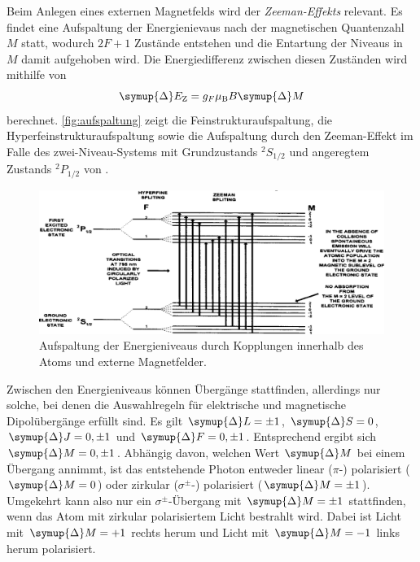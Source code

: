     Beim Anlegen eines externen Magnetfelds wird der \textit{Zeeman-Effekts} relevant.
    Es findet eine Aufspaltung der Energienievaus nach der magnetischen Quantenzahl $M$ statt,
    wodurch $2F+1$ Zustände entstehen und die Entartung der Niveaus in $M$ damit aufgehoben wird.
    Die Energiedifferenz zwischen diesen Zuständen wird mithilfe von
    \begin{equation}
        \symup{\Delta} E_\text{Z} = g_F \mu_\text{B} B \symup{\Delta} M
        \label{eqn:zeemanaufspaltung}
    \end{equation}
    berechnet.
    \autoref{fig:aufspaltung} zeigt die Feinstrukturaufspaltung,
    die Hyperfeinstrukturaufspaltung sowie die Aufspaltung durch den Zeeman-Effekt im Falle des zwei-Niveau-Systems mit Grundzustands $^2S_{1/2}$ und angeregtem Zustands $^2P_{1/2}$ von .
    \begin{figure}[H]
        \centering
        \includegraphics[width=\textwidth]{content/img/Lit2_Abb_2D-3.png}
        \caption{Aufspaltung der Energieniveaus durch Kopplungen innerhalb des Atoms und externe Magnetfelder. \cite{caltech}}
        \label{fig:aufspaltung}
    \end{figure}
    Zwischen den Energieniveaus können Übergänge stattfinden,
    allerdings nur solche,
    bei denen die Auswahlregeln für elektrische und magnetische Dipolübergänge erfüllt sind.
    Es gilt $\symup{\Delta} L = \pm 1$, $\symup{\Delta} S = 0$, $\symup{\Delta} J = 0, \pm 1$ und $\symup{\Delta} F = 0, \pm 1$.
    Entsprechend ergibt sich $\symup{\Delta} M = 0, \pm 1$.
    Abhängig davon,
    welchen Wert $\symup{\Delta} M$ bei einem Übergang annimmt,
    ist das entstehende Photon entweder linear ($\pi$-) polarisiert ($\symup{\Delta}M = 0$) oder zirkular ($\sigma^{\pm}$-) polarisiert ($\symup{\Delta}M = \pm 1$).
    Umgekehrt kann also nur ein $\sigma^{\pm}$-Übergang mit $\symup{\Delta} M = \pm 1$ stattfinden,
    wenn das Atom mit zirkular polarisiertem Licht bestrahlt wird.
    Dabei ist Licht mit $\symup{\Delta} M = +1$ rechts herum und Licht mit $\symup{\Delta} M =-1$ links herum polarisiert.

